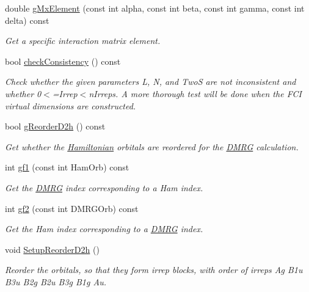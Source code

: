 \begin{DoxyCompactItemize}
double \hyperlink{classCheMPS2_1_1Problem_af3ad2a73da9b8af05d145b448cf8bc36}{g\-Mx\-Element} (const int alpha, const int beta, const int gamma, const int delta) const 
\begin{DoxyCompactList}\small\item\em Get a specific interaction matrix element. \end{DoxyCompactList}\item 
bool \hyperlink{classCheMPS2_1_1Problem_a6e26b40eb9bf80eb9979083b58a4e30e}{check\-Consistency} () const 
\begin{DoxyCompactList}\small\item\em Check whether the given parameters L, N, and Two\-S are not inconsistent and whether 0$<$=Irrep$<$n\-Irreps. A more thorough test will be done when the F\-C\-I virtual dimensions are constructed. \end{DoxyCompactList}\item 
bool \hyperlink{classCheMPS2_1_1Problem_ad451eb3fdbd695b938a15515450b6679}{g\-Reorder\-D2h} () const 
\begin{DoxyCompactList}\small\item\em Get whether the \hyperlink{classCheMPS2_1_1Hamiltonian}{Hamiltonian} orbitals are reordered for the \hyperlink{classCheMPS2_1_1DMRG}{D\-M\-R\-G} calculation. \end{DoxyCompactList}\item 
int \hyperlink{classCheMPS2_1_1Problem_af261a2869feffd866b1f7ee5052c9ae9}{gf1} (const int Ham\-Orb) const 
\begin{DoxyCompactList}\small\item\em Get the \hyperlink{classCheMPS2_1_1DMRG}{D\-M\-R\-G} index corresponding to a Ham index. \end{DoxyCompactList}\item 
int \hyperlink{classCheMPS2_1_1Problem_ac5d35cb647b66606e3cf69a21bbcb98a}{gf2} (const int D\-M\-R\-G\-Orb) const 
\begin{DoxyCompactList}\small\item\em Get the Ham index corresponding to a \hyperlink{classCheMPS2_1_1DMRG}{D\-M\-R\-G} index. \end{DoxyCompactList}\item 
\hypertarget{classCheMPS2_1_1Problem_ace8f96e419792f829198e96b897da0a9}{void \hyperlink{classCheMPS2_1_1Problem_ace8f96e419792f829198e96b897da0a9}{Setup\-Reorder\-D2h} ()}\label{classCheMPS2_1_1Problem_ace8f96e419792f829198e96b897da0a9}

\begin{DoxyCompactList}\small\item\em Reorder the orbitals, so that they form irrep blocks, with order of irreps Ag B1u B3u B2g B2u B3g B1g Au. \end{DoxyCompactList}\end{DoxyCompactItemize}


